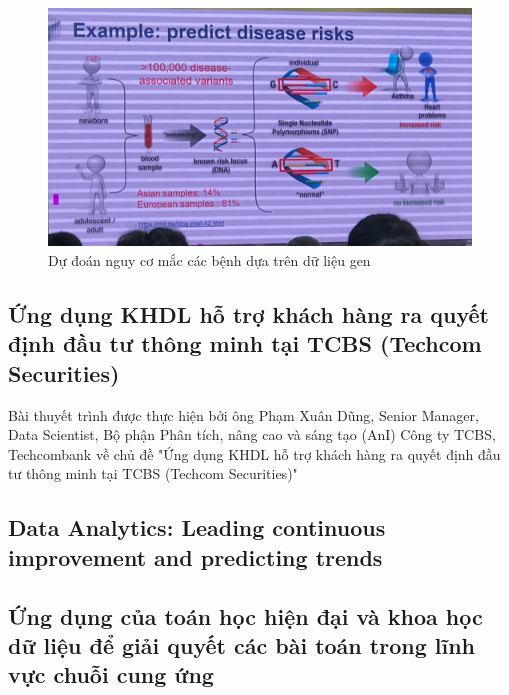 \documentclass[14pt, a4paper]{article}
\numberwithin{equation}{section}
\numberwithin{figure}{section}
\numberwithin{dl}{section}
\numberwithin{md}{section}
\numberwithin{bd}{section}
\numberwithin{dn}{section}
\numberwithin{hq}{section}
\begin{document}
    \begin{figure}[h!]
        \centering
        \includegraphics{predict-disease-risk.png}
        \caption{Dự đoán nguy cơ mắc các bệnh dựa trên dữ liệu gen}
    \end{figure}

    \subsection{Ứng dụng KHDL hỗ trợ khách hàng ra quyết định đầu tư thông minh tại TCBS (Techcom Securities)}

    Bài thuyết trình được thực hiện bởi ông Phạm Xuân Dũng, Senior Manager, Data Scientist, Bộ phận Phân tích, nâng cao và sáng tạo (AnI) Công ty TCBS, Techcombank về chủ đề "Ứng dụng KHDL hỗ trợ khách hàng ra quyết định đầu tư thông minh tại TCBS (Techcom Securities)"

    \subsection{Data Analytics: Leading continuous improvement and predicting trends}

    \subsection{Ứng dụng của toán học hiện đại và khoa học dữ liệu để giải quyết các bài toán trong lĩnh vực chuỗi cung ứng}
\end{document}
